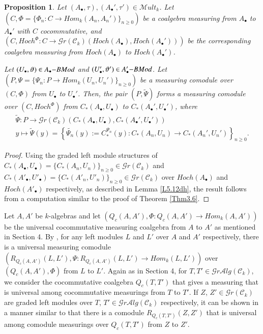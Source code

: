 \documentclass[10pt, colorlinks]{article}
\numberwithin{equation}{section} \DeclareMathSizes{2}{10}{12}{13}
\newtheorem{thm}{Proposition}[section]
\begin{document}
\begin{thm}\label{prop5.5}
    Let $(A_\bullet,\tau),(A_\bullet',\tau')\in \mathscr Mult_k$. Let $(C,\Phi=\{\Phi_n:C\longrightarrow Hom_k(A_n,A_n')\}_{n\geq 0})$ be a coalgebra measuring from $A_\bullet$ to $A_\bullet'$ with $C$ cocommutative, and $(C,Hoch^{\Phi}: C\longrightarrow \mathscr Gr(\mathcal C_k)(Hoch(A_\bullet),Hoch(A_\bullet')))$ be the corresponding coalgebra measuring from $Hoch(A_\bullet)$ to $Hoch(A_\bullet')$.

\smallskip
    Let $(U_\bullet,\vartheta)\in {A_\bullet\small{-}}BMod$ and $(U'_\bullet,\vartheta')\in A'_\bullet\small{-}BMod$.  Let $(P,\Psi=\{\Psi_n:P\longrightarrow  {Hom}_k(U_n,U_n')\}_{n\geq 0})$ be a measuring comodule over $(C,\Phi)$ from $U_\bullet$ to $U_\bullet'$. Then, the pair $(P,\widetilde{\Psi})$ forms a measuring comodule over $(C,Hoch^{\Phi})$ from $C_*(A_\bullet,U_\bullet)$ to $C_*(A_\bullet',U_\bullet')$, where
    \begin{equation}\label{eq5.24pp}
        \begin{array}{c}
              \widetilde{\Psi}:P\longrightarrow \mathscr Gr(\mathcal C_k)(C_*(A_\bullet,U_\bullet),C_*(A_\bullet',U_\bullet')) \\
             y\longmapsto \widetilde{\Psi}(y)=\left\{\widetilde{\Psi_n}(y):=C_*^{\Psi_n}(y):C_*(A_n,U_n)\longrightarrow C_*(A_n',U_n')\right\}_{n\geq 0}.
        \end{array}
    \end{equation}
     
\end{thm}

\begin{proof}
Using the graded left module structures of $C_*(A_\bullet,U_\bullet)=\{C_*(A_n,U_n)\}_{n\geq 0}\in  \mathscr Gr(\mathcal C_k)$ and  $C_*(A'_\bullet,U'_\bullet)=\{C_*(A'_n,U'_n)\}_{n\geq 0}\in  \mathscr Gr(\mathcal C_k)$  over $Hoch(A_\bullet)$ and $Hoch(A'_\bullet)$ respectively, as described in Lemma \ref{L5.12dh}, the result follows from a computation similar to the proof of Theorem \ref{Thm3.6}.
\end{proof}



  Let $A,A'$ be $k$-algebras and let $(Q_c(A,A'),\Phi:Q_c(A,A')\longrightarrow Hom_k(A,A'))$ be the universal cocommutative measuring coalgebra   from $A$ to $A'$ as mentioned in Section 4.  By \cite[ Lemma 5.2, Lemma 5.4]{MB}, for any left modules $L$ and $L'$ over $A$ and $A'$ respectively, there is a universal measuring comodule 
  $(R_{Q_c(A,A')}(L,L'),\Psi: R_{Q_c(A,A')}(L,L')\longrightarrow Hom_k(L, L'))$ over $(Q_c(A,A'),\Phi)$ from $L$ to $L'$. Again as in Section 4, for $T, T'\in \mathscr Gr\mathcal Alg(\mathcal C_k)$, we consider the cocommutative coalgebra $Q_c(T,T')$ that gives a measuring that is universal among cocommutative measurings from $T$ to $T'$.   If $Z$, $Z'\in \mathscr Gr(\mathcal C_k)$ are graded left modules over $T$, $T'\in \mathscr Gr\mathcal Alg(\mathcal C_k)$ respectively, it can be shown in a manner similar to  \cite{MB} that there is a comodule $R_{Q_c(T,T')}(Z,Z')$ that is universal among comodule measurings over $Q_c(T,T')$ from $Z$ to $Z'$. 
  
\end{document}
